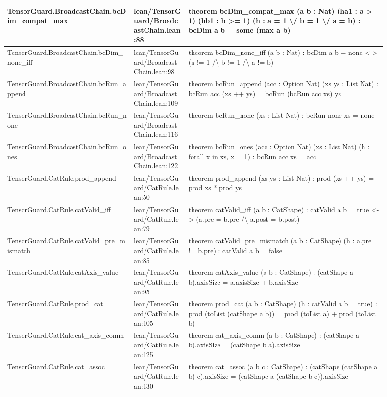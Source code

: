 \documentclass[10pt]{article}
\begin{document}
\begin{longtable}{|p{0.30\linewidth}|p{0.13\linewidth}|p{0.47\linewidth}|}
\hline
TensorGuard.BroadcastChain.bcDim\_compat\_max & lean/TensorGuard/BroadcastChain.lean:88 & theorem bcDim\_compat\_max (a b : Nat) (ha1 : a >= 1) (hb1 : b >= 1) (h : a = 1 \textbackslash{}/ b = 1 \textbackslash{}/ a = b) : bcDim a b = some (max a b) \\
\hline
TensorGuard.BroadcastChain.bcDim\_none\_iff & lean/TensorGuard/BroadcastChain.lean:98 & theorem bcDim\_none\_iff (a b : Nat) : bcDim a b = none <-> (a != 1 /\textbackslash{} b != 1 /\textbackslash{} a != b) \\
\hline
TensorGuard.BroadcastChain.bcRun\_append & lean/TensorGuard/BroadcastChain.lean:109 & theorem bcRun\_append (acc : Option Nat) (xs ys : List Nat) : bcRun acc (xs ++ ys) = bcRun (bcRun acc xs) ys \\
\hline
TensorGuard.BroadcastChain.bcRun\_none & lean/TensorGuard/BroadcastChain.lean:116 & theorem bcRun\_none (xs : List Nat) : bcRun none xs = none \\
\hline
TensorGuard.BroadcastChain.bcRun\_ones & lean/TensorGuard/BroadcastChain.lean:122 & theorem bcRun\_ones (acc : Option Nat) (xs : List Nat) (h : forall x in xs, x = 1) : bcRun acc xs = acc \\
\hline
TensorGuard.CatRule.prod\_append & lean/TensorGuard/CatRule.lean:50 & theorem prod\_append (xs ys : List Nat) : prod (xs ++ ys) = prod xs * prod ys \\
\hline
TensorGuard.CatRule.catValid\_iff & lean/TensorGuard/CatRule.lean:79 & theorem catValid\_iff (a b : CatShape) : catValid a b = true <-> (a.pre = b.pre /\textbackslash{} a.post = b.post) \\
\hline
TensorGuard.CatRule.catValid\_pre\_mismatch & lean/TensorGuard/CatRule.lean:85 & theorem catValid\_pre\_mismatch (a b : CatShape) (h : a.pre != b.pre) : catValid a b = false \\
\hline
TensorGuard.CatRule.catAxis\_value & lean/TensorGuard/CatRule.lean:95 & theorem catAxis\_value (a b : CatShape) : (catShape a b).axisSize = a.axisSize + b.axisSize \\
\hline
TensorGuard.CatRule.prod\_cat & lean/TensorGuard/CatRule.lean:105 & theorem prod\_cat (a b : CatShape) (h : catValid a b = true) : prod (toList (catShape a b)) = prod (toList a) + prod (toList b) \\
\hline
TensorGuard.CatRule.cat\_axis\_comm & lean/TensorGuard/CatRule.lean:125 & theorem cat\_axis\_comm (a b : CatShape) : (catShape a b).axisSize = (catShape b a).axisSize \\
\hline
TensorGuard.CatRule.cat\_assoc & lean/TensorGuard/CatRule.lean:130 & theorem cat\_assoc (a b c : CatShape) : (catShape (catShape a b) c).axisSize = (catShape a (catShape b c)).axisSize \\

\end{longtable}
\end{document}
